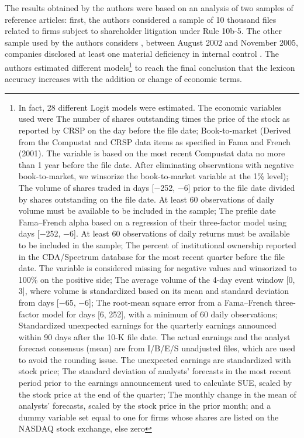 The results obtained by the authors were based on an analysis of two samples of reference articles: first, the authors considered a sample of 10 thousand files related to firms subject to shareholder litigation under Rule 10b-5. The other sample used by the authors considers \cite{doyle2007accruals}, between August 2002 and November 2005, companies disclosed at least one material deficiency in internal control \citep[p. 41]{loughran2011liability}. The authors estimated different models\footnote{In fact, 28 different Logit models were estimated. The economic variables used were The number of shares outstanding times the price of the stock as reported by CRSP on the day before the file date; Book-to-market (Derived from the Compustat and CRSP data items as specified in Fama and French (2001). The variable is based on the most recent Compustat data no more than 1 year before the file date. After eliminating observations with negative book-to-market, we winsorize the book-to-market variable at the 1\% level); The volume of shares traded in days [−252, −6] prior to the file date divided by shares outstanding on the file date. At least 60 observations of daily volume must be available to be included in the sample; The prefile date Fama–French alpha based on a regression of their three-factor model using days [−252, −6]. At least 60 observations of daily returns must be available to be included in the sample; The percent of institutional ownership reported in the CDA/Spectrum database for the most recent quarter before the file date. The variable is considered missing for negative values and winsorized to 100\% on the positive side; The average volume of the 4-day event window [0, 3], where volume is standardized based on its mean and standard deviation from days [−65, −6]; The root-mean square error from a Fama–French three-factor model for days [6, 252], with a minimum of 60 daily observations; Standardized unexpected earnings for the quarterly earnings announced within 90 days after the 10-K file date. The actual earnings and the analyst forecast consensus (mean) are from I/B/E/S unadjusted files, which are used to avoid the rounding issue. The unexpected earnings are standardized with stock price; The standard deviation of analysts’ forecasts in the most recent period prior to the earnings announcement used to calculate SUE, scaled by the stock price at the end of the quarter; The monthly change in the mean of analysts’ forecasts, scaled by the stock price in the prior month; and a dummy variable set equal to one for firms whose shares are listed on the NASDAQ stock exchange, else zero\citep[p.63]{loughran2011liability}} to reach the final conclusion that the lexicon accuracy increases with the addition or change of economic terms.\\


